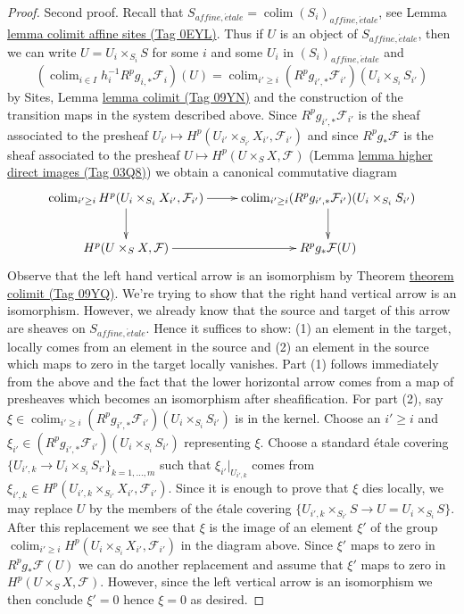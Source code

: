 \documentclass{amsart}
\theoremstyle{plain}
\theoremstyle{definition}
\theoremstyle{remark}
\numberwithin{equation}{subsection}
\def\colim{\mathop{\mathrm{colim}}\nolimits}
\def\etale{{\acute{e}tale}}
\begin{document}
\begin{proof}
\medskip\noindent
Second proof.
Recall that $S_{affine, \etale} = \colim (S_i)_{affine, \etale}$, see
Lemma \href{https://stacks.math.columbia.edu/tag/0EYL}{lemma colimit affine sites (Tag 0EYL)}. Thus if $U$ is an object of
$S_{affine, \etale}$, then we can write $U = U_i \times_{S_i} S$
for some $i$ and some $U_i$ in $(S_i)_{affine, \etale}$ and
$$
(\colim_{i \in I} h_i^{-1}R^p g_{i, *} \mathcal{F}_i)(U) =
\colim_{i' \geq i} (R^p g_{i', *}\mathcal{F}_{i'})(U_i \times_{S_i} S_{i'})
$$
by Sites, Lemma \href{https://stacks.math.columbia.edu/tag/09YN}{lemma colimit (Tag 09YN)} and the construction of the
transition maps in the system described above. Since
$R^pg_{i', *}\mathcal{F}_{i'}$ is the sheaf associated to the presheaf
$U_{i'} \mapsto H^p(U_{i'} \times_{S_{i'}} X_{i'}, \mathcal{F}_{i'})$
and since $R^pg_*\mathcal{F}$ is the sheaf associated to the presheaf
$U \mapsto H^p(U \times_S X, \mathcal{F})$
(Lemma \href{https://stacks.math.columbia.edu/tag/03Q8}{lemma higher direct images (Tag 03Q8)})
we obtain a canonical commutative diagram
$$
\xymatrix{
\colim_{i' \geq i}
H^p(U_i \times_{S_i} X_{i'}, \mathcal{F}_{i'}) \ar[r] \ar[d] &
\colim_{i' \geq i}
(R^p g_{i', *}\mathcal{F}_{i'})(U_i \times_{S_i} S_{i'}) \ar[d] \\
H^p(U \times_S X, \mathcal{F}) \ar[r] &
R^pg_*\mathcal{F}(U)
}
$$
Observe that the left hand vertical arrow is an isomorphism
by Theorem \href{https://stacks.math.columbia.edu/tag/09YQ}{theorem colimit (Tag 09YQ)}. We're trying to show that
the right hand vertical arrow is an isomorphism. However, we
already know that the source and target of this arrow
are sheaves on $S_{affine, \etale}$. Hence it suffices to
show: (1) an element in the target, locally comes from an
element in the source and (2) an element in the source
which maps to zero in the target locally vanishes.
Part (1) follows immediately from the above and the fact that
the lower horizontal arrow comes from a map of presheaves
which becomes an isomorphism after sheafification.
For part (2), say $\xi \in  \colim_{i' \geq i}
(R^p g_{i', *}\mathcal{F}_{i'})(U_i \times_{S_i} S_{i'})$
is in the kernel. Choose an $i' \geq i$ and
$\xi_{i'} \in (R^p g_{i', *}\mathcal{F}_{i'})(U_i \times_{S_i} S_{i'})$
representing $\xi$.
Choose a standard \'etale covering
$\{U_{i', k} \to U_i \times_{S_i} S_{i'}\}_{k = 1, \ldots, m}$
such that $\xi_{i'}|_{U_{i', k}}$ comes from
$\xi_{i', k} \in H^p(U_{i', k} \times_{S_{i'}} X_{i'}, \mathcal{F}_{i'})$.
Since it is enough to prove that $\xi$ dies locally, we
may replace $U$ by the members of the \'etale
covering $\{U_{i', k} \times_{S_{i'}} S \to U = U_i \times_{S_i} S\}$.
After this replacement we see that $\xi$ is the image of
an element $\xi'$ of the group
$\colim_{i' \geq i} H^p(U_i \times_{S_i} X_{i'}, \mathcal{F}_{i'})$
in the diagram above. Since $\xi'$ maps to zero in $R^pg_*\mathcal{F}(U)$
we can do another replacement and assume that $\xi'$ maps
to zero in $H^p(U \times_S X, \mathcal{F})$.
However, since the left vertical arrow is an isomorphism
we then conclude $\xi' = 0$ hence $\xi = 0$ as desired.
\end{proof}
\end{document}
